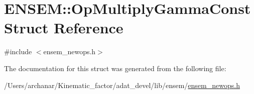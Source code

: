 \hypertarget{structENSEM_1_1OpMultiplyGammaConst}{}\section{E\+N\+S\+EM\+:\+:Op\+Multiply\+Gamma\+Const Struct Reference}
\label{structENSEM_1_1OpMultiplyGammaConst}


{\ttfamily \#include $<$ensem\+\_\+newops.\+h$>$}



The documentation for this struct was generated from the following file\+:\begin{DoxyCompactItemize}
\item 
/\+Users/archanar/\+Kinematic\+\_\+factor/adat\+\_\+devel/lib/ensem/\mbox{\hyperlink{lib_2ensem_2ensem__newops_8h}{ensem\+\_\+newops.\+h}}\end{DoxyCompactItemize}
